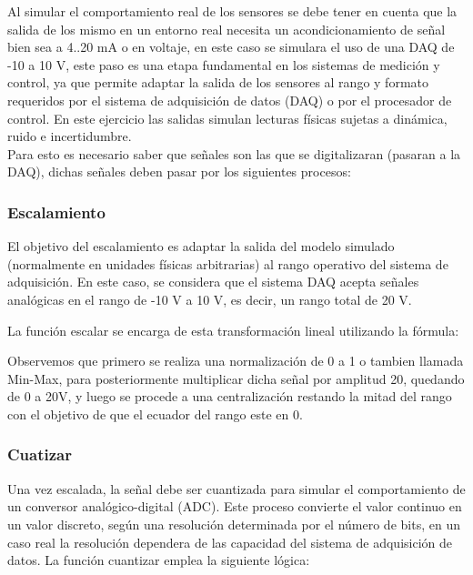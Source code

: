 \documentclass[conference]{IEEEtran}
\begin{document}
Al simular el comportamiento real de los sensores se debe tener en cuenta que la salida de los mismo en un entorno real necesita un acondicionamiento de señal bien sea a 4..20 mA o en voltaje, en este caso se simulara el uso de una DAQ de -10 a 10 V, este paso es una etapa fundamental en los sistemas de medición y control, ya que permite adaptar la salida de los sensores al rango y formato requeridos por el sistema de adquisición de datos (DAQ) o por el procesador de control. En este ejercicio las salidas simulan lecturas físicas sujetas a dinámica, ruido e incertidumbre.\\

Para esto es necesario saber que señales son las que se digitalizaran (pasaran a la DAQ), dichas señales deben pasar por los siguientes procesos:

\subsubsection{Escalamiento}

El objetivo del escalamiento es adaptar la salida del modelo simulado (normalmente en unidades físicas arbitrarias) al rango operativo del sistema de adquisición. En este caso, se considera que el sistema DAQ acepta señales analógicas en el rango de -10 V a 10 V, es decir, un rango total de 20 V.

La función escalar se encarga de esta transformación lineal utilizando la fórmula:



Observemos que primero se realiza una normalización de 0 a 1 o tambien llamada Min-Max, para posteriormente multiplicar dicha señal por amplitud 20, quedando de 0 a 20V, y luego se procede a una centralización restando la mitad del rango con el objetivo de que el ecuador del rango este en 0.

\subsubsection{Cuatizar}

Una vez escalada, la señal debe ser cuantizada para simular el comportamiento de un conversor analógico-digital (ADC). Este proceso convierte el valor continuo en un valor discreto, según una resolución determinada por el número de bits, en un caso real la resolución dependera de las capacidad del sistema de adquisición de datos. La función cuantizar emplea la siguiente lógica:
\end{document}
